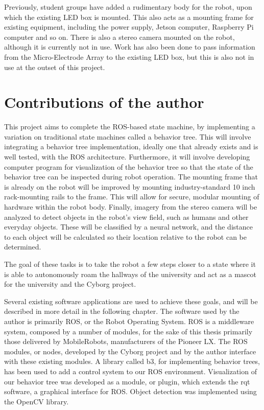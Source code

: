 \documentclass[\rootfolder/main.tex]{subfiles}
\begin{document}
Previously, student groups have added a rudimentary body for the robot, upon which the existing LED box is mounted.
This also acts as a mounting frame for existing equipment, including the power supply, Jetson computer, Raspberry Pi computer and so on.
There is also a stereo camera mounted on the robot, although it is currently not in use.
Work has also been done to pass information from the Micro-Electrode Array to the existing LED box, but this is also not in use at the outset of this project.

\section{Contributions of the author}

This project aims to complete the ROS-based state machine, by implementing a variation on traditional state machines called a behavior tree.
This will involve integrating a behavior tree implementation, ideally one that already exists and is well tested, with the ROS architecture.
Furthermore, it will involve developing computer program for visualization of the behavior tree so that the state of the behavior tree can be inspected during robot operation.
The mounting frame that is already on the robot will be improved by mounting industry-standard 10 inch rack-mounting rails to the frame.
This will allow for secure, modular mounting of hardware within the robot body.
Finally, imagery from the stereo camera will be analyzed to detect objects in the robot's view field, such as humans and other everyday objects.
These will be classified by a neural network, and the distance to each object will be calculated so their location relative to the robot can be determined.

The goal of these tasks is to take the robot a few steps closer to a state where it is able to autonomously roam the hallways of the university and act as a mascot for the university and the Cyborg project.

Several existing software applications are used to achieve these goals, and will be described in more detail in the following chapter.
The software used by the author is primarily ROS, or the Robot Operating System.
ROS is a middleware system, composed by a number of modules, for the sake of this thesis primarily those delivered by MobileRobots, manufacturers of the Pioneer LX.
The ROS modules, or nodes, developed by the Cyborg project and by the author interface with these existing modules.
A library called b3, for implementing behavior trees, has been used to add a control system to our ROS environment.
Visualization of our behavior tree was developed as a module, or plugin, which extends the rqt software, a graphical interface for ROS.
Object detection was implemented using the OpenCV library.
\end{document}
